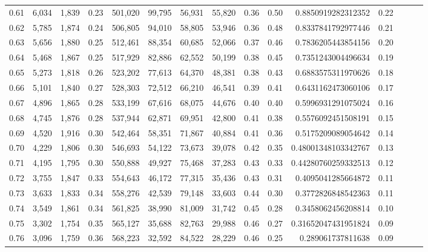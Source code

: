 \begin{tabular}{rrrrrrrrrrrrrrr}
0.61 &   6,034 &  1,839 &  0.23 &  501,020 &   99,795 &   56,931 &   55,820 &  0.36 &  0.50 &      0.8850919282312352 &      0.22 \\
0.62 &   5,785 &  1,874 &  0.24 &  506,805 &   94,010 &   58,805 &   53,946 &  0.36 &  0.48 &      0.8337841792977446 &      0.21 \\
0.63 &   5,656 &  1,880 &  0.25 &  512,461 &   88,354 &   60,685 &   52,066 &  0.37 &  0.46 &      0.7836205443854156 &      0.20 \\
0.64 &   5,468 &  1,867 &  0.25 &  517,929 &   82,886 &   62,552 &   50,199 &  0.38 &  0.45 &      0.7351243004496634 &      0.19 \\
0.65 &   5,273 &  1,818 &  0.26 &  523,202 &   77,613 &   64,370 &   48,381 &  0.38 &  0.43 &      0.6883575311970626 &      0.18 \\
0.66 &   5,101 &  1,840 &  0.27 &  528,303 &   72,512 &   66,210 &   46,541 &  0.39 &  0.41 &      0.6431162473060106 &      0.17 \\
0.67 &   4,896 &  1,865 &  0.28 &  533,199 &   67,616 &   68,075 &   44,676 &  0.40 &  0.40 &      0.5996931291075024 &      0.16 \\
0.68 &   4,745 &  1,876 &  0.28 &  537,944 &   62,871 &   69,951 &   42,800 &  0.41 &  0.38 &      0.5576092451508191 &      0.15 \\
0.69 &   4,520 &  1,916 &  0.30 &  542,464 &   58,351 &   71,867 &   40,884 &  0.41 &  0.36 &      0.5175209089054642 &      0.14 \\
0.70 &   4,229 &  1,806 &  0.30 &  546,693 &   54,122 &   73,673 &   39,078 &  0.42 &  0.35 &     0.48001348103342767 &      0.13 \\
0.71 &   4,195 &  1,795 &  0.30 &  550,888 &   49,927 &   75,468 &   37,283 &  0.43 &  0.33 &     0.44280760259332513 &      0.12 \\
0.72 &   3,755 &  1,847 &  0.33 &  554,643 &   46,172 &   77,315 &   35,436 &  0.43 &  0.31 &      0.4095041285664872 &      0.11 \\
0.73 &   3,633 &  1,833 &  0.34 &  558,276 &   42,539 &   79,148 &   33,603 &  0.44 &  0.30 &      0.3772826848542363 &      0.11 \\
0.74 &   3,549 &  1,861 &  0.34 &  561,825 &   38,990 &   81,009 &   31,742 &  0.45 &  0.28 &      0.3458062456208814 &      0.10 \\
0.75 &   3,302 &  1,754 &  0.35 &  565,127 &   35,688 &   82,763 &   29,988 &  0.46 &  0.27 &     0.31652047431951824 &      0.09 \\
0.76 &   3,096 &  1,759 &  0.36 &  568,223 &   32,592 &   84,522 &   28,229 &  0.46 &  0.25 &       0.289061737811638 &      0.09 \\

\end{tabular}
